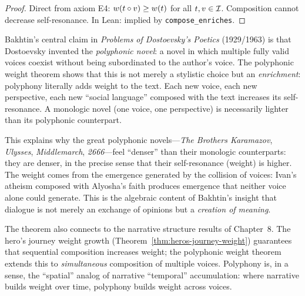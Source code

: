 \begin{proof}
Direct from axiom E4: $w(t \circ v) \geq w(t)$ for all $t, v \in \mathcal{I}$.  Composition cannot decrease self-resonance.  In Lean: implied by \texttt{compose\_enriches}.
\end{proof}

\begin{interpretation}
\label{interp:dostoevsky-polyphony}
Bakhtin's central claim in \textit{Problems of Dostoevsky's Poetics} (1929/1963) is that Dostoevsky invented the \emph{polyphonic novel}: a novel in which multiple fully valid voices coexist without being subordinated to the author's voice.  The polyphonic weight theorem shows that this is not merely a stylistic choice but an \emph{enrichment}: polyphony literally adds weight to the text.  Each new voice, each new perspective, each new ``social language'' composed with the text increases its self-resonance.  A monologic novel (one voice, one perspective) is necessarily lighter than its polyphonic counterpart.

This explains why the great polyphonic novels---\textit{The Brothers Karamazov}, \textit{Ulysses}, \textit{Middlemarch}, \textit{2666}---feel ``denser'' than their monologic counterparts: they are denser, in the precise sense that their self-resonance (weight) is higher.  The weight comes from the emergence generated by the collision of voices: Ivan's atheism composed with Alyosha's faith produces emergence that neither voice alone could generate.  This is the algebraic content of Bakhtin's insight that dialogue is not merely an exchange of opinions but a \emph{creation of meaning}.

The theorem also connects to the narrative structure results of Chapter~8.  The hero's journey weight growth (Theorem~\ref{thm:heros-journey-weight}) guarantees that sequential composition increases weight; the polyphonic weight theorem extends this to \emph{simultaneous} composition of multiple voices.  Polyphony is, in a sense, the ``spatial'' analog of narrative ``temporal'' accumulation: where narrative builds weight over time, polyphony builds weight across voices.
\end{interpretation}

